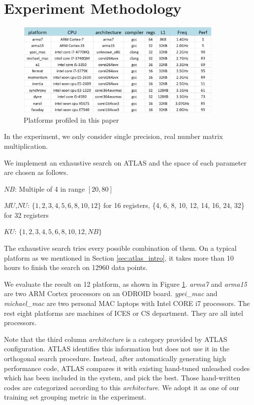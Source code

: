 \section{Experiment Methodology}
\label{sec:experiment}
\begin{figure}[tbhp]
  \centering
  \includegraphics[width=0.9\textwidth]{images/platforms.png}
  \caption{Platforms profiled in this paper}
  \label{fig:platforms}
\end{figure}

In the experiment, we only consider single precision, real number matrix multiplication.
\par
We implement an exhaustive search on ATLAS and the space of each parameter are chosen as follows.\par
$NB$: Multiple of 4 in range $[20, 80]$\par
$MU$,$NU$: $\{1, 2, 3, 4, 5, 6, 8, 10, 12\}$ for 16 registers,
		\{4, 6, 8, 10, 12, 14, 16, 24, 32\} for 32 registers\par
$KU$: $\{1, 2, 3, 4, 5, 6, 8, 10, 12, NB\}$\par
The exhaustive search tries every possible combination of them.
On a typical platform as we mentioned in Section \ref{sec:atlas_intro}, it takes more than 10 hours to finish
the search on 12960 data points.\par

We evaluate the result on 12 platform, as shown in Figure \ref{fig:platforms}. \textit{arma7} and \textit{arma15}
are two ARM Cortex processors on an ODROID board.
\textit{ypei\_mac} and \textit{michael\_mac} are two personal MAC laptops
with Intel CORE i7 processors. The rest eight platforms are machines of ICES or CS department. They are all intel processors.\par

Note that the third column \textit{architecture} is a category provided by ATLAS configuration.
ATLAS identifies this information but does not use it in the orthogonal search procedure. Instead, after automatically
generating high performance code, ATLAS compares it with existing hand-tuned unleashed codes which has been included in the system,
and pick the best. Those hand-written codes are categorized according to this \textit{architecture}.
We adopt it as one of our training set grouping metric in the experiment.\par


